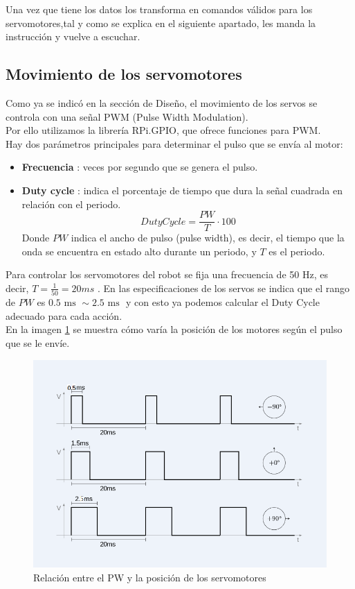 \documentclass[twoside, 11pt]{epstfg}
\begin{document}
Una vez que tiene los datos los transforma en comandos válidos para los servomotores,tal y como se explica en el siguiente apartado, les manda la instrucción y vuelve a escuchar.


\subsection{Movimiento de los servomotores}\label{sub:movS}


Como ya se indicó en la sección de Diseño, el movimiento de los servos se controla con una señal PWM (Pulse Width Modulation).\\
Por ello utilizamos la librería RPi.GPIO, que ofrece funciones para PWM.\\
Hay dos parámetros principales para determinar el pulso que se envía al motor:
\begin{itemize}
	\item \textbf{Frecuencia} : veces por segundo que se genera el pulso.
	\item \textbf{Duty cycle} : indica el porcentaje de tiempo que dura la señal cuadrada en relación con el periodo.
	$$DutyCycle = \frac{PW}{T}\cdot 100$$
	Donde $PW$ indica el ancho de pulso (pulse width), es decir, el tiempo que la onda se encuentra en estado alto durante un periodo, y $T$ es el periodo.
\end{itemize}

Para controlar los servomotores del robot se fija una frecuencia de 50 Hz, es decir, $T = \frac{1}{50} = 20 ms$ .
En las especificaciones de los servos se indica que el rango de $PW$ es $0.5 \text{ ms } \sim 2.5\text{ ms }$ y con esto ya podemos calcular el Duty Cycle adecuado para cada acción.\\
En la imagen \ref{figPWM} se muestra cómo varía la posición de los motores según el pulso que se le envíe.

\begin{figure}[h!]
	\centerline{
		\mbox{\includegraphics[width=.80\textwidth]{images/PWMServos.png}}
	}
	\caption{Relación entre el PW y la posición de los servomotores}
	\label{figPWM}
\end{figure}
\end{document}
